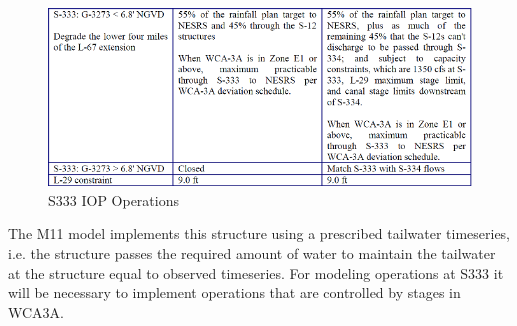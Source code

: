 \begin{figure}[!h]
  \begin{center}
  \includegraphics[width=6.5in]{../figs/S333_IOPops.png}
  \caption{S333 IOP Operations}
  \label{fig:S333iop}
  \end{center}
\end{figure}

%
%
%
%



The M11 model implements this structure using a prescribed tailwater timeseries, i.e. the structure passes the required amount of water to maintain the tailwater at the structure equal to observed timeseries. For modeling operations at S333 it will be necessary to implement operations that are controlled by stages in WCA3A.


